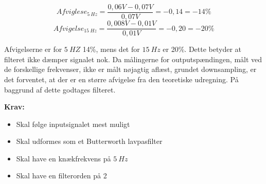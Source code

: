 \begin{equation} \label{equ:afvigelse1}
Afviglese_{5~Hz} = \frac{0,06V-0,07V}{0,07V} = -0,14  = - 14 \%
\end{equation}
\begin{equation} \label{equ:afvigelse2}
Afvigelse_{15~Hz} = \frac{0,008V-0,01V}{0,01V} = -0,20  = -20 \%
\end{equation}

\noindent 
Afvigelserne er for $5~HZ$ 14\%, mens det for $15~Hz$ er 20\%. Dette betyder at filteret ikke dæmper signalet nok. Da målingerne for outputspændingen, målt ved de forskellige frekvenser, ikke er målt nøjagtig aflæst, grundet downsampling, er det forventet, at der er en større afvigelse fra den teoretiske udregning. På baggrund af dette godtages filteret. 

\vspace{3mm}
\textbf{Krav:}
\begin{itemize}
\item[\text{\sffamily \checkmark}] Skal følge inputsignalet mest muligt  
\item[\text{\sffamily \checkmark}] Skal udformes som et Butterworth lavpasfilter
\item[\text{\sffamily \checkmark}] Skal have en knækfrekvens på $5~Hz$
\item[\text{\sffamily \checkmark}] Skal have en filterorden på 2
\end{itemize}